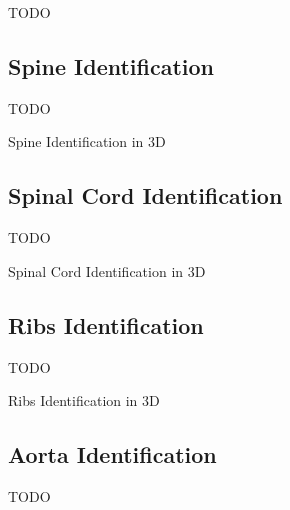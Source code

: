 TODO

\subsection{Spine Identification}

TODO

\begin{stulisting}[p]
\caption{Spine Identification in 3D}
\label{code:featureid-3d-spineidentification}

\end{stulisting}

\subsection{Spinal Cord Identification}

TODO

\begin{stulisting}[p]
\caption{Spinal Cord Identification in 3D}
\label{code:featureid-3d-spinalcordidentification}

\end{stulisting}

\subsection{Ribs Identification}
\label{subsec:featureid-3d-ribsidentification}

TODO

\begin{stulisting}[p]
\caption{Ribs Identification in 3D}
\label{code:featureid-3d-ribsidentification}

\end{stulisting}

\subsection{Aorta Identification}

TODO

